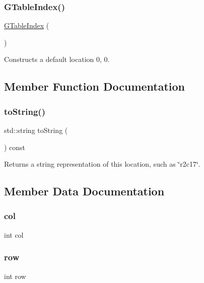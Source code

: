 \subsubsection{\texorpdfstring{G\+Table\+Index()}{GTableIndex()}\hspace{0.1cm}{\footnotesize\ttfamily [2/2]}}
{\footnotesize\ttfamily \mbox{\hyperlink{structsgl_1_1GTableIndex}{G\+Table\+Index}} (\begin{DoxyParamCaption}{ }\end{DoxyParamCaption})}



Constructs a default location 0, 0. 



\subsection{Member Function Documentation}
\mbox{\label{structsgl_1_1GTableIndex_a1fe5121d6528fdea3f243321b3fa3a49}} 
\subsubsection{\texorpdfstring{to\+String()}{toString()}}
{\footnotesize\ttfamily std\+::string to\+String (\begin{DoxyParamCaption}{ }\end{DoxyParamCaption}) const}



Returns a string representation of this location, such as \char`\"{}r2c17\char`\"{}. 



\subsection{Member Data Documentation}
\mbox{\label{structsgl_1_1GTableIndex_afb52e720f5f0c483db5861f9e42e924e}} 
\subsubsection{\texorpdfstring{col}{col}}
{\footnotesize\ttfamily int col}

\mbox{\label{structsgl_1_1GTableIndex_af1d3cff2e4538e23400e260bae3dadad}} 
\subsubsection{\texorpdfstring{row}{row}}
{\footnotesize\ttfamily int row}

